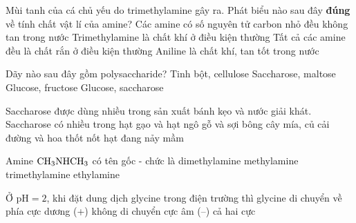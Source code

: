 \documentclass[11pt,a4paper]{article}
\begin{document}
\begin{ex}
Mùi tanh của cá chủ yếu do trimethylamine gây ra. Phát biểu nào sau đây \textbf{đúng} về tính chất vật lí của amine?
\choice
{Các amine có số nguyên tử carbon nhỏ đều không tan trong nước}
{\True Trimethylamine là chất khí ở điều kiện thường}
{Tất cả các amine đều là chất rắn ở điều kiện thường}
{Aniline là chất khí, tan tốt trong nước}



\end{ex}

\begin{ex}
Dãy nào sau đây gồm polysaccharide?
\choice
{\True Tinh bột, cellulose}
{Saccharose, maltose}
{Glucose, fructose}
{Glucose, saccharose}



\end{ex}

\begin{ex}
Saccharose được dùng nhiều trong sản xuất bánh kẹo và nước giải khát. Saccharose có nhiều trong
\choice
{hạt gạo và hạt ngô}
{gỗ và sợi bông}
{\True cây mía, củ cải đường và hoa thốt nốt}
{hạt đang nảy mầm}



\end{ex}

\begin{ex}
Amine $\ce{CH3NHCH3}$ có tên gốc - chức là
\choice
{\True dimethylamine}
{methylamine}
{trimethylamine}
{ethylamine}



\end{ex}

\begin{ex}
Ở $\text{pH} = 2$, khi đặt dung dịch glycine trong điện trường thì glycine di chuyển về phía
\choice
{cực dương (+)}
{không di chuyển}
{\True cực âm (--)}
{cả hai cực}



\end{ex}
\end{document}
